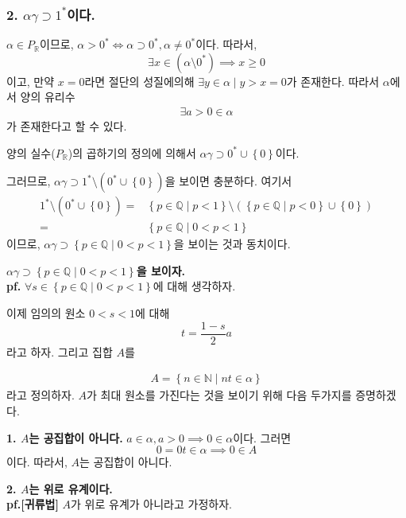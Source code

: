 \documentclass{article}
\begin{document}
\subsubsection{2. $\alpha \gamma \supset 1^*$이다.}

$\alpha \in P_\mathbb{R}$이므로, $\alpha > 0^* \iff \alpha \supset 0^*, \alpha \neq 0^*$이다. 따라서, $$\exists x \in (\alpha \setminus  0^*) \implies x \ge 0$$
이고, 만약 $x = 0$라면 절단의 성질에의해 $\exists y \in \alpha \mid y > x = 0$가 존재한다. 따라서 $\alpha$에서 양의 유리수 
\begin{align*}
\exists a > 0 \in \alpha \tag{1}
\end{align*}가 존재한다고 할 수 있다.


양의 실수($P_{\mathbb{R}}$)의 곱하기의 정의에 의해서 $\alpha \gamma \supset 0^* \cup \left\{0\right\}$이다. 

그러므로, $\alpha \gamma \supset 1^* \setminus \left( 0^* \cup \left\{0\right\} \right)$을 보이면 충분하다. 여기서 
\begin{align*}
1^* \setminus \left( 0^* \cup \left\{0\right\} \right) =& \left\{p \in \mathbb{Q} \mid p < 1 \right\} \setminus \left( \left\{p \in \mathbb{Q} \mid p < 0 \right\} \cup \left\{0\right\} \right)
\\ =& \left\{p \in \mathbb{Q} \mid 0 < p < 1 \right\}
\end{align*}이므로, $\alpha \gamma \supset \left\{p \in \mathbb{Q} \mid 0 < p < 1 \right\}$을 보이는 것과 동치이다.

\textbf{$\alpha \gamma \supset \left\{p \in \mathbb{Q} \mid 0 < p < 1 \right\}$을 보이자.}
\\ \textbf{pf.} $\forall s \in \left\{p \in \mathbb{Q} \mid 0 < p < 1 \right\}$에 대해 생각하자. 

이제 임의의 원소 $0 < s < 1$에 대해
$$ t = \frac{1-s}{2} a $$라고 하자. 그리고 집합 $A$를

\begin{align*}
A = \left\{n \in \mathbb{N} \mid nt \in \alpha  \right\}
\end{align*}라고 정의하자. $A$가 최대 원소를 가진다는 것을 보이기 위해 다음 두가지를 증명하겠다.

\textbf{1. $A$는 공집합이 아니다.}
$a \in \alpha, a > 0 \implies 0 \in \alpha$이다. 그러면 
$$ 0 = 0t \in \alpha \implies 0 \in A$$이다.
따라서, $A$는 공집합이 아니다.

\textbf{2. $A$는 위로 유계이다.}
\\ \textbf{pf.[귀류법]} $A$가 위로 유계가 아니라고 가정하자. 
\end{document}
